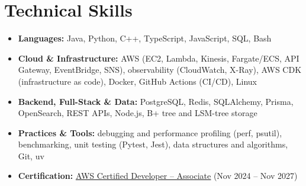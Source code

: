 \documentclass[letterpaper,10pt]{article}
\begin{document}
\section{Technical Skills}
\begin{itemize}[leftmargin=0in, label={}, itemsep=0pt, topsep=2pt]
  \small
  \item{\textbf{Languages:} Java, Python, C++, TypeScript, JavaScript, SQL, Bash}
  \item{\textbf{Cloud \& Infrastructure:} AWS (EC2, Lambda, Kinesis, Fargate/ECS, API Gateway, EventBridge, SNS), observability (CloudWatch, X-Ray), AWS CDK (infrastructure as code), Docker, GitHub Actions (CI/CD), Linux}
  \item{\textbf{Backend, Full-Stack \& Data:} PostgreSQL, Redis, SQLAlchemy, Prisma, OpenSearch, REST APIs, Node.js, B+ tree and LSM-tree storage}
  \item{\textbf{Practices \& Tools:} debugging and performance profiling (perf, psutil), benchmarking, unit testing (Pytest, Jest), data structures and algorithms, Git, uv}
  \item{\textbf{Certification:} \href{https://www.credly.com/badges/d2406a97-d937-47de-823b-724981159d3b/public_url}{\underline{AWS Certified Developer -- Associate}} (Nov 2024 -- Nov 2027)}
\end{itemize}
\end{document}
